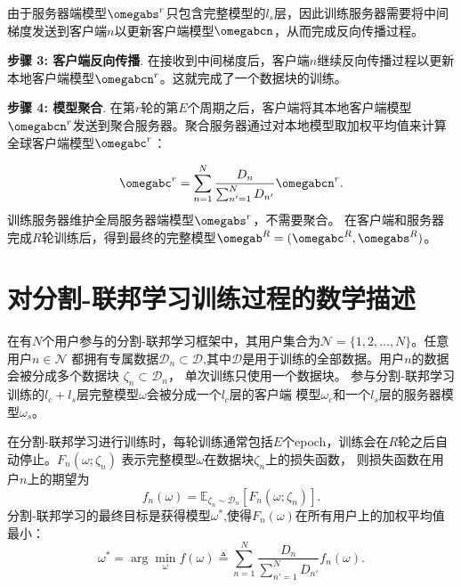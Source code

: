 由于服务器端模型$\omegabs^{r}$只包含完整模型的$l_s$层，因此训练服务器需要将中间梯度发送到客户端$n$以更新客户端模型$\omegabcn$，从而完成反向传播过程。

\textbf{步骤 3: 客户端反向传播}. 在接收到中间梯度后，客户端$n$继续反向传播过程以更新本地客户端模型$\omegabcn^r$。这就完成了一个数据块的训练。

\textbf{步骤 4: 模型聚合}. 在第$r$轮的第$E$个周期之后，客户端将其本地客户端模型$\omegabcn^r$发送到聚合服务器。聚合服务器通过对本地模型取加权平均值来计算全球客户端模型$\omegabc^r$：

\begin{equation}\label{eq:c-agg}
\omegabc^r=\sum_{n=1}^{N}\frac{D_n}{\sum_{n'=1}^{N}D_{n'}}\omegabcn^r.
\end{equation}
训练服务器维护全局服务器端模型$\omegabs^r$，不需要聚合。 
在客户端和服务器完成$R$轮训练后，得到最终的完整模型$\omegab^R=(\omegabc^R,\omegabs^R)$。

\section{对分割-联邦学习训练过程的数学描述}
在有$N$个用户参与的分割-联邦学习框架中，其用户集合为$\mathcal{N}=\{1,2,\ldots, N\}$。任意用户$n\in \mathcal{N}$
都拥有专属数据$\mathcal{D}_n \subset \mathcal{D}$,其中$\mathcal{D}$是用于训练的全部数据。用户$n$的数据会被分成多个数据块 $\zeta_n\subset\mathcal{D}_n$，
单次训练只使用一个数据块。
参与分割-联邦学习训练的$l_c+l_s$层完整模型$\omega$会被分成一个$l_c$层的客户端
模型$\omega_c$和一个$l_s$层的服务器模型$\omega_s$。

在分割-联邦学习进行训练时，每轮训练通常包括$E$个epoch，训练会在$R$轮之后自动停止。$F_n(\omega;\zeta_n)$
表示完整模型$\omega$在数据块$\zeta_n$上的损失函数，
则损失函数在用户$n$上的期望为
\begin{equation}\label{eq:exp-fn}
f_n\left(\omega\right)=\mathbb{E}_{\zeta_n\sim \mathcal{D}_n}\left[F_n\left(\omega;\zeta_n\right)\right].
\end{equation}
分割-联邦学习的最终目标是获得模型$\omega^*$,使得$F_n(\omega)$在所有用户上的加权平均值最小：
\begin{equation}\label{Objective of SFL}
\omega^* =\arg \min_{\omega}f(\omega)\triangleq \sum_{n=1}^{N}\frac{D_n}{\sum_{n'=1}^{N}D_{n'}}f_{n}(\omega).
\end{equation}

